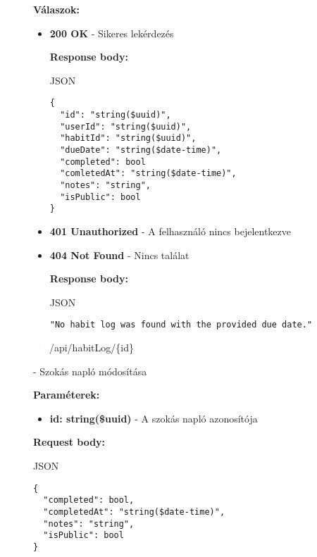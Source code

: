 \documentclass[12pt]{report}
\newcommand{\httpPatch}[1]{\colorbox{patchColor}{\textbf{\textcolor{white}{PATCH}}}~#1}
\begin{document}
\begin{description}
    \vspace{0.5cm}
    \textbf{Válaszok:}
    \begin{itemize}
      \item \textbf{200 OK} - Sikeres lekérdezés

        \textbf{Response body:}
        \begin{codeblock}{JSON}
          \begin{verbatim}
{
  "id": "string($uuid)",
  "userId": "string($uuid)",
  "habitId": "string($uuid)",
  "dueDate": "string($date-time)",
  "completed": bool
  "comletedAt": "string($date-time)",
  "notes": "string",
  "isPublic": bool
}
          \end{verbatim}
        \end{codeblock}

      \item \textbf{401 Unauthorized} - A felhasználó nincs bejelentkezve

      \item \textbf{404 Not Found} - Nincs találat
      
        \textbf{Response body:}
        \begin{codeblock}{JSON}
          \begin{verbatim}
"No habit log was found with the provided due date."
          \end{verbatim}
        \end{codeblock}
    \end{itemize}

  \item[\httpPatch{/api/habitLog/\{id\}}] - Szokás napló módosítása
  
    \vspace{0.5cm}
    \textbf{Paraméterek:}
    \begin{itemize}
      \item \textbf{id: string(\$uuid)} - A szokás napló azonosítója
    \end{itemize}

    \vspace{0.5cm}
    \textbf{Request body:}
    \begin{codeblock}{JSON}
      \begin{verbatim}
{
  "completed": bool,
  "completedAt": "string($date-time)",
  "notes": "string",
  "isPublic": bool
}
      \end{verbatim}
    \end{codeblock}


\end{description}
\end{document}
